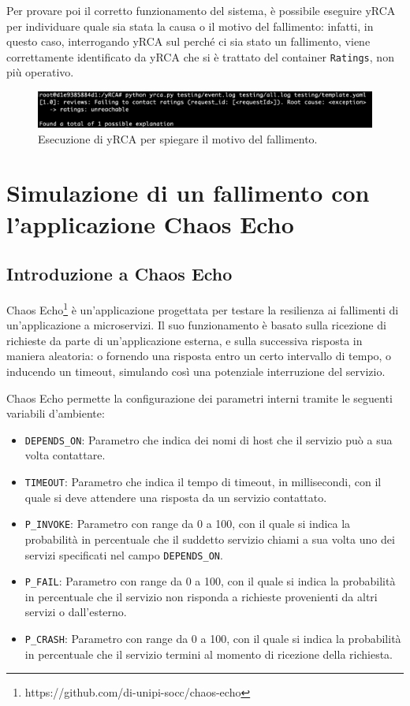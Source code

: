Per provare poi il corretto funzionamento del sistema, è possibile eseguire yRCA per individuare quale sia stata la causa o il motivo del fallimento: infatti, in questo caso, interrogando yRCA sul perché ci sia stato un fallimento, viene correttamente identificato da yRCA che si è trattato del container \texttt{Ratings}, non più operativo.
\begin{figure}[h]
    \centering
    \includegraphics[width=\textwidth]{immagini/capitolo5/bookinfo_yrca.png}
    \caption{Esecuzione di yRCA per spiegare il motivo del fallimento.}
    \label{fig:yrca-error}
\end{figure}


\section{Simulazione di un fallimento con l'applicazione Chaos Echo}
\subsection{Introduzione a Chaos Echo}
Chaos Echo\footnote{https://github.com/di-unipi-socc/chaos-echo} è un'applicazione progettata per testare la resilienza ai fallimenti di un'applicazione a microservizi. Il suo funzionamento è basato sulla ricezione di richieste da parte di un'applicazione esterna, e sulla successiva risposta in maniera aleatoria: o fornendo una risposta entro un certo intervallo di tempo, o inducendo un timeout, simulando così una potenziale interruzione del servizio.

Chaos Echo permette la configurazione dei parametri interni tramite le seguenti variabili d'ambiente:
\begin{itemize}
    \item \texttt{DEPENDS\_ON}: Parametro che indica dei nomi di host che il servizio può a sua volta contattare.
    \item \texttt{TIMEOUT}: Parametro che indica il tempo di timeout, in millisecondi, con il quale si deve attendere una risposta da un servizio contattato.
    \item \texttt{P\_INVOKE}: Parametro con range da 0 a 100, con il quale si indica la probabilità in percentuale che il suddetto servizio chiami a sua volta uno dei servizi specificati nel campo \texttt{DEPENDS\_ON}.
    \item \texttt{P\_FAIL}: Parametro con range da 0 a 100, con il quale si indica la probabilità in percentuale che il servizio non risponda a richieste provenienti da altri servizi o dall'esterno.
    \item \texttt{P\_CRASH}: Parametro con range da 0 a 100, con il quale si indica la probabilità in percentuale che il servizio termini al momento di ricezione della richiesta.
\end{itemize}


